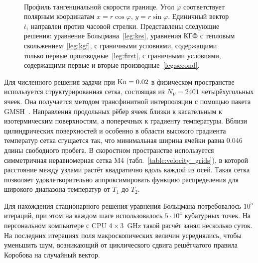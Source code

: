 \begin{figure}
    \centering
    \\
    \caption{
        Профиль тангенциальной скорости границе. Угол \(\varphi\) соответствует полярным координатам
        \(x=r\cos\varphi\), \(y=r\sin\varphi\). Единичный вектор \(t_i\) направлен против часовой стрелки.
        Представлены следующие решения: уравнение Больцмана~\ref{leg:kes},
        уравнения КГФ с тепловым скольжением~\ref{leg:kgf},
        с граничными условиями, содержащими только первые производные~\ref{leg:first},
        с граничными условиями, содержащими первые и вторые производные~\ref{leg:second}.
    }
    \label{fig:profile-vel}
\end{figure}

Для численного решения задачи при \(\mathrm{Kn}=0.02\) в физическом пространстве
используется структурированная сетка, состоящая из \(N_V=2401\) четырёхугольных ячеек.
Она получается методом трансфинитной интерполяции с помощью пакета GMSH~\cite{gmsh}.
Направления продольных рёбер ячеек близки к касательным к изотермическим поверхностям,
а поперечных к градиенту температуры.
Вблизи цилиндрических поверхностей и особенно в области высокого градиента температур
сетка сгущается так, что минимальная ширина ячейки равна 0.046 длины свободного пробега.
В скоростном пространстве используется симметричная неравномерная сетка M4 (табл.~\ref{table:velocity_grids}),
в которой расстояние между узлами растёт квадратично вдоль каждой из осей.
Такая сетка позволяет удовлетворительно аппроксимировать функцию распределения
для широкого диапазона температур от \(T_1\) до \(T_2\).

Для нахождения стационарного решения уравнения Больцмана потребовалось \(10^5\) итераций,
при этом на каждом шаге использовалось \(5\cdot10^4\) кубатурных точек.
На персональном компьютере с CPU \(4\times3\)~GHz такой расчёт занял несколько суток.
На последних итерациях поля макроскопических величин усреднялись,
чтобы уменьшить шум, возникающий от циклического сдвига решётчатого правила Коробова
на случайный вектор.

